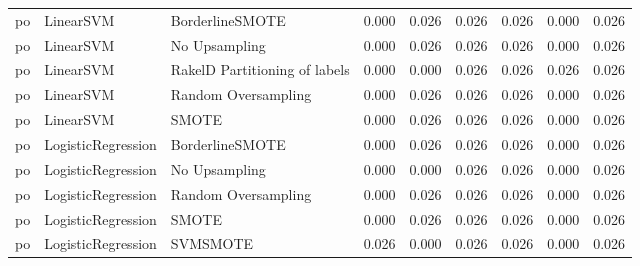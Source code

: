\begin{tabular}{lllllllll}
      po &                       LinearSVM &               BorderlineSMOTE &     0.000 &                     0.026 &                 0.026 &                  0.026 &                                   0.000 &     0.026 \\
      po &                       LinearSVM &                 No Upsampling &     0.000 &                     0.026 &                 0.026 &                  0.026 &                                   0.000 &     0.026 \\
      po &                       LinearSVM & RakelD Partitioning of labels &     0.000 &                     0.000 &                 0.026 &                  0.026 &                                   0.026 &     0.026 \\
      po &                       LinearSVM &           Random Oversampling &     0.000 &                     0.026 &                 0.026 &                  0.026 &                                   0.000 &     0.026 \\
      po &                       LinearSVM &                         SMOTE &     0.000 &                     0.026 &                 0.026 &                  0.026 &                                   0.000 &     0.026 \\
      po &              LogisticRegression &               BorderlineSMOTE &     0.000 &                     0.026 &                 0.026 &                  0.026 &                                   0.000 &     0.026 \\
      po &              LogisticRegression &                 No Upsampling &     0.000 &                     0.000 &                 0.026 &                  0.026 &                                   0.000 &     0.026 \\
      po &              LogisticRegression &           Random Oversampling &     0.000 &                     0.026 &                 0.026 &                  0.026 &                                   0.000 &     0.026 \\
      po &              LogisticRegression &                         SMOTE &     0.000 &                     0.026 &                 0.026 &                  0.026 &                                   0.000 &     0.026 \\
      po &              LogisticRegression &                      SVMSMOTE &     0.026 &                     0.000 &                 0.026 &                  0.026 &                                   0.000 &     0.026 \\

\end{tabular}
